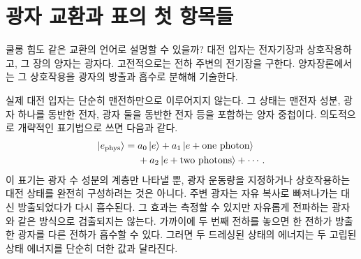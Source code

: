 \begin{classroomqa}
\end{classroomqa}

\begin{classroomqa}
\end{classroomqa}

\begin{classroomqa}
\end{classroomqa}

\section{광자 교환과 표의 첫 항목들}

쿨롱 힘도 같은 교환의 언어로 설명할 수 있을까? 대전 입자는 전자기장과 상호작용하고, 그 장의 양자는 광자다. 고전적으로는 전하 주변의 전기장을 구한다. 양자장론에서는 그 상호작용을 광자의 방출과 흡수로 분해해 기술한다.

실제 대전 입자는 단순히 맨전하만으로 이루어지지 않는다. 그 상태는 맨전자 성분, 광자 하나를 동반한 전자, 광자 둘을 동반한 전자 등을 포함하는 양자 중첩이다. 의도적으로 개략적인 표기법으로 쓰면 다음과 같다.
\begin{equation}
\begin{aligned}
\left\lvert e_{\mathrm{phys}}\right\rangle
={}&a_0\left\lvert e\right\rangle
+a_1\left\lvert e+\text{one photon}\right\rangle
\\
&+a_2\left\lvert e+\text{two photons}\right\rangle+\cdots .
\end{aligned}
\end{equation}
이 표기는 광자 수 성분의 계층만 나타낼 뿐, 광자 운동량을 지정하거나 상호작용하는 대전 상태를 완전히 구성하려는 것은 아니다.
주변 광자는 자유 복사로 빠져나가는 대신 방출되었다가 다시 흡수된다. 그 효과는 측정할 수 있지만 자유롭게 전파하는 광자와 같은 방식으로 검출되지는 않는다. 가까이에 두 번째 전하를 놓으면 한 전하가 방출한 광자를 다른 전하가 흡수할 수 있다. 그러면 두 드레싱된 상태의 에너지는 두 고립된 상태 에너지를 단순히 더한 값과 달라진다.

